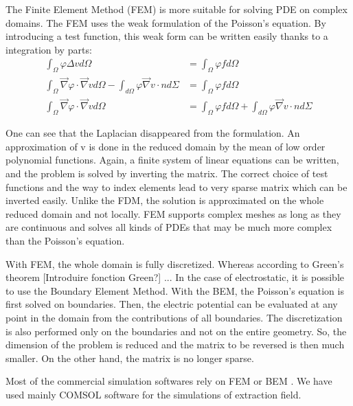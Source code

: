 \begin{refsection}
  The Finite Element Method (FEM) is more suitable for solving PDE on complex domains. The FEM uses the weak formulation of the Poisson’s equation. By introducing a test function, this weak form can be written easily thanks to a integration by parts:
  \begin{align}
    \int_{\Omega}^{} \varphi \Delta v d\Omega                                                                             & = \int_{\Omega}^{} \varphi f d\Omega \\
    \int_{\Omega}^{} \vec{\nabla} \varphi \cdot \vec{\nabla} v d\Omega - \int_{d\Omega}^{} \varphi \vec{\nabla} v \cdot n d\Sigma & = \int_{\Omega}^{} \varphi f d\Omega                                                      \\
    \int_{\Omega}^{} \vec{\nabla} \varphi \cdot \vec{\nabla} v d\Omega & = \int_{\Omega}^{} \varphi f d\Omega + \int_{d\Omega}^{} \varphi \vec{\nabla} v \cdot n d\Sigma
  \end{align}

  One can see that the Laplacian disappeared from the formulation. An approximation of v is done in the reduced domain by the mean of low order polynomial functions. Again, a finite system of linear equations can be written, and the problem is solved by inverting the matrix. The correct choice of test functions and the way to index elements lead to very sparse matrix which can be inverted easily. Unlike the FDM, the solution is approximated on the whole reduced domain and not locally. FEM supports complex meshes as long as they are continuous and solves all kinds of PDEs that may be much more complex than the Poisson’s equation.

  With FEM, the whole domain is fully discretized. Whereas according to Green's theorem [Introduire fonction Green?] ... In the case of electrostatic, it is possible to use the Boundary Element Method. With the BEM, the Poisson’s equation is first solved on boundaries. Then, the electric potential can be evaluated at any point in the domain from the contributions of all boundaries. The discretization is also performed only on the boundaries and not on the entire geometry. So, the dimension of the problem is reduced and the matrix to be reversed is then much smaller. On the other hand, the matrix is ​​no longer sparse.

  Most of the commercial simulation softwares rely on FEM or BEM \cite{cststudio2018,ansys2018,couloumb2018}. We have used mainly COMSOL software for the simulations of extraction field.


\end{refsection}
